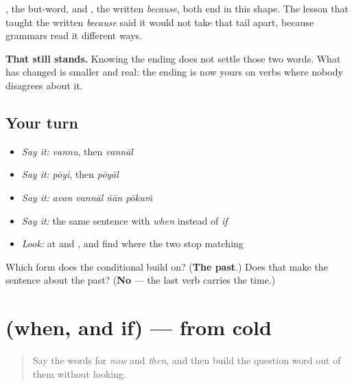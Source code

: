 \begin{grammarlens}[title={What you've built}]
\textbf{}, the but-word, and \textbf{}, the written \emph{because}, both end in this shape. The lesson that taught the written \emph{because} said it would not take that tail apart, because grammars read it different ways.

\textbf{That still stands.} Knowing the ending does not settle those two words. What has changed is smaller and real: the ending is now yours on verbs where nobody disagrees about it.
\end{grammarlens}

\subsection*{Your turn}
\begin{itemize}
\raggedright
  \item \emph{Say it:} \emph{vannu}, then \emph{vannāl}
  \item \emph{Say it:} \emph{pōyi}, then \emph{pōyāl}
  \item \emph{Say it:} \emph{avan vannāl ñān pōkuṁ}
  \item \emph{Say it:} the same sentence with \emph{when} instead of \emph{if}
  \item \emph{Look:} at \textbf{} and \textbf{}, and find where the two stop matching
\end{itemize}

\begin{tcolorbox}[breakable,colback=teal!4,colframe=teal!35!black,title={Before you move on}]
Which form does the conditional build on? (\textbf{The past}.) Does that make the sentence about the past? (\textbf{No} — the last verb carries the time.)
\end{tcolorbox}
\section[(when, and if)]{(when, and if) — from cold}

\label{lesson:ML-R75-when-and-if-recall}



\begin{quote}
Say the words for \emph{now} and \emph{then}, and then build the question word out of them without looking.
\end{quote}

